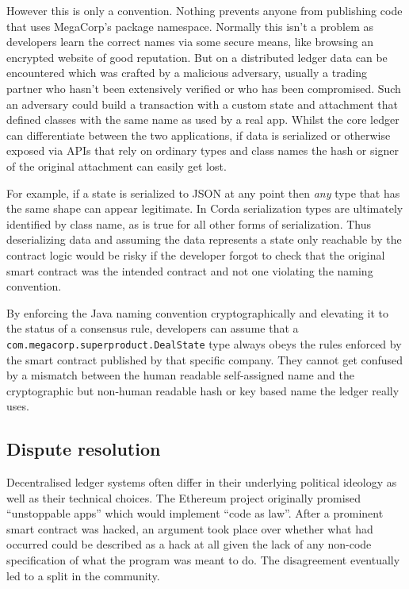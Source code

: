 \documentclass{article}
\begin{document}
However this is only a convention. Nothing prevents anyone from publishing code that uses MegaCorp's package
namespace. Normally this isn't a problem as developers learn the correct names via some secure means, like browsing
an encrypted website of good reputation. But on a distributed ledger data can be encountered which was crafted by a
malicious adversary, usually a trading partner who hasn't been extensively verified or who has been compromised.
Such an adversary could build a transaction with a custom state and attachment that defined classes with the same
name as used by a real app. Whilst the core ledger can differentiate between the two applications, if data is
serialized or otherwise exposed via APIs that rely on ordinary types and class names the hash or signer of the
original attachment can easily get lost.

For example, if a state is serialized to JSON at any point then \emph{any} type that has the same shape can appear
legitimate. In Corda serialization types are ultimately identified by class name, as is true for all other forms of
serialization. Thus deserializing data and assuming the data represents a state only reachable by the contract
logic would be risky if the developer forgot to check that the original smart contract was the intended contract
and not one violating the naming convention.

By enforcing the Java naming convention cryptographically and elevating it to the status of a consensus rule,
developers can assume that a \texttt{com.megacorp.superproduct.DealState} type always obeys the rules enforced by
the smart contract published by that specific company. They cannot get confused by a mismatch between the human
readable self-assigned name and the cryptographic but non-human readable hash or key based name the ledger really
uses.


\subsection{Dispute resolution}\label{subsec:bug-fixes-and-dispute-resolution}

Decentralised ledger systems often differ in their underlying political ideology as well as their technical
choices. The Ethereum project originally promised ``unstoppable apps'' which would implement ``code as law''. After
a prominent smart contract was hacked\cite{TheDAOHack}, an argument took place over whether what had occurred could
be described as a hack at all given the lack of any non-code specification of what the program was meant to do. The
disagreement eventually led to a split in the community.
\end{document}
